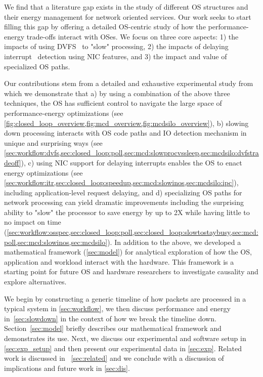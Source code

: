 
We find that a literature gap exists in the study of different OS structures and their energy management for network oriented services.  Our work seeks to start filling this gap by offering a detailed OS-centric study of how the performance-energy trade-offs interact with OSes.  We focus on three core aspects: 1) the impacts of using DVFS~\cite{cpufreq_governor} to "slow" processing, 2) the impacts of delaying interrupt~\cite{intelitr} detection using NIC features, and 3) the impact and value of specialized OS paths.

Our contributions stem from a detailed and exhaustive experimental study from which we demonstrate that
a) by using a combination of the above three techniques, the OS has sufficient control to navigate the large space of performance-energy optimizations (see \cref{fig:closed_loop_overview,fig:mcd_overview,fig:mcdsilo_overview}),
b) slowing down processing interacts with OS code paths and IO detection mechanism in unique and surprising ways (see \cref{sec:workflow:dvfs,sec:closed_loop:poll,sec:mcd:slowprocvssleep,sec:mcdsilo:dvfstradeoff}),
c) using NIC support for delaying interrupts enables the OS to enact energy optimizations (see \cref{sec:workflow:itr,sec:closed_loop:speedup,sec:mcd:slowinos,sec:mcdsilo:ipc}), including  application-level request delaying\cite{mootaz,udpm},
and d) specializing OS paths for network processing can yield dramatic improvements including the surprising ability to "slow" the processor to save energy by up to 2X while having little to no impact on time (\cref{sec:workflow:osspec,sec:closed_loop:poll,sec:closed_loop:slowtostaybusy,sec:mcd:poll,sec:mcd:slowinos,sec:mcdsilo}).   
In addition to the above, we developed a mathematical framework (\cref{sec:model}) for analytical exploration of how the OS, application and workload interact with the hardware.  
This framework is a starting point for future OS and hardware researchers to investigate causality and explore alternatives. 

We begin by constructing a generic timeline of how packets are processed in a typical system in \cref{sec:workflow}, 
we then discuss performance and energy in~\cref{sec:slowdown} in the context of how we break the timeline down.
Section~\cref{sec:model} briefly describes our mathematical framework and demonstrates its use. Next, we discuss our experimental and software setup in \cref{sec:exp_setup} and then present our experimental data in \cref{sec:exp}. Related work is discussed in ~\cref{sec:related} and  we conclude with  a discussion of implications and future work in \cref{sec:dis}.



